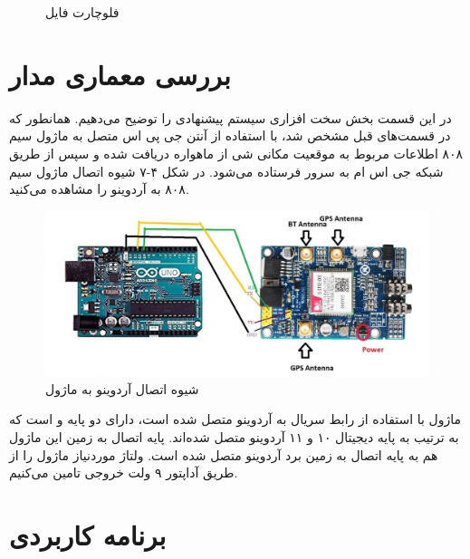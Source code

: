 \begin{figure}[h!]
	\caption{فلوچارت فایل   \cite{ElShafee2013}}
\end{figure}
\section{بررسی معماری مدار}
در این قسمت بخش سخت‌ افزاری سیستم پیشنهادی را توضیح می‌دهیم. همانطور که در قسمت‌های قبل مشخص شد، با استفاده از آنتن جی‌ پی اس متصل به ماژول سیم ۸۰۸ اطلاعات مربوط به موقعیت مکانی شی از ماهواره دریافت شده و سپس از طریق شبکه جی اس ام به سرور فرستاده می‌شود. در شکل ۴-۷ شیوه اتصال ماژول سیم ۸۰۸ به آردوینو را مشاهده می‌کنید.
\\
\begin{figure}[!h]
	\centerline{\includegraphics[width=.6\textwidth]{sim808-arduino}}
	\caption{شیوه اتصال آردوینو به ماژول \cite{interface}}
\end{figure}


ماژول  با استفاده از رابط سریال به آردوینو متصل شده است، دارای دو پایه  و  است که به ترتیب به پایه دیجیتال ۱۰ و ۱۱ آردوینو متصل شده‌اند. پایه اتصال به زمین این ماژول هم به پایه اتصال به زمین برد آردوینو متصل شده است. ولتاژ موردنیاز ماژول  را از طریق آداپتور ۹ ولت خروجی تامین می‌کنیم. 
\section{برنامه کاربردی}